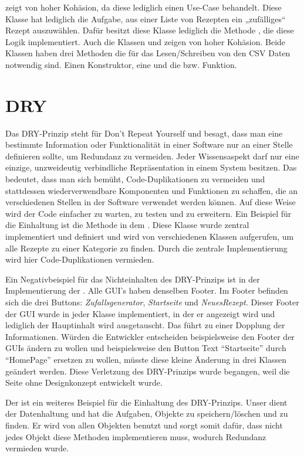 \href{https://github.com/MichaelaHaag/RezeptApp/blob/main/1-Adapter/src/main/java/de/rezeptapp/adapter/GUIFunktionen/FunktionenZufallsGenerator.java}{} zeigt von hoher Kohäsion, da diese lediglich einen Use-Case behandelt. Diese Klasse hat lediglich die Aufgabe, aus einer Liste von Rezepten ein „zufälliges“ Rezept auszuwählen. Dafür besitzt diese Klasse lediglich die Methode , die diese Logik implementiert. Auch die Klassen  und  zeigen von hoher Kohäsion. Beide Klassen haben drei Methoden die für das Lesen/Schreiben von den CSV Daten notwendig sind. Einen Konstruktor, eine  und die  bzw.  Funktion. 

\section{DRY}\label{DRY}
Das DRY-Prinzip steht für \glqq Don't Repeat Yourself \grqq{} und besagt, dass man eine bestimmte Information oder Funktionalität in einer Software nur an einer Stelle definieren sollte, um Redundanz zu vermeiden. Jeder Wissensaspekt darf nur eine einzige, unzweideutig verbindliche Repräsentation in einem
System besitzen. Das bedeutet, dass man sich bemüht, Code-Duplikationen zu vermeiden und stattdessen wiederverwendbare Komponenten und Funktionen zu schaffen, die an verschiedenen Stellen in der Software verwendet werden können. Auf diese Weise wird der Code einfacher zu warten, zu testen und zu erweitern.
Ein Beispiel für die Einhaltung ist die Methode  in dem . Diese Klasse wurde zentral implementiert und definiert und wird von verschiedenen Klassen aufgerufen, um alle Rezepte zu einer Kategorie zu finden. Durch die zentrale Implementierung wird hier Code-Duplikationen vermieden. 

Ein Negativbeispiel für das Nichteinhalten des DRY-Prinzips ist in der Implementierung der \href{https://github.com/MichaelaHaag/RezeptApp/blob/main/0-Plugins/src/main/java/de/rezeptapp/plugins/gui}{}. Alle GUI's haben denselben Footer. Im Footer befinden sich die drei Buttons: \emph{Zufallsgenerator}, \emph{Startseite} und \emph{NeuesRezept}. Dieser Footer der GUI wurde in jeder Klasse implementiert, in der er angezeigt wird und lediglich der Hauptinhalt wird ausgetauscht. Das führt zu einer Dopplung der Informationen. Würden die Entwickler entscheiden beispielsweise den Footer der GUIs ändern zu wollen und beispielsweise den Button Text \enquote{Startseite} durch \enquote{HomePage} ersetzen zu wollen, müsste diese kleine Änderung in drei Klassen geändert werden. Diese Verletzung des DRY-Prinzips wurde begangen, weil die Seite ohne Designkonzept entwickelt wurde.  

Der  ist ein weiteres Beispiel für die Einhaltung des DRY-Prinzips. Unser  dient der Datenhaltung und hat die Aufgaben, Objekte zu speichern/löschen und zu finden. Er wird von allen Objekten benutzt und sorgt somit dafür, dass nicht jedes Objekt diese Methoden implementieren muss, wodurch Redundanz vermieden wurde.

